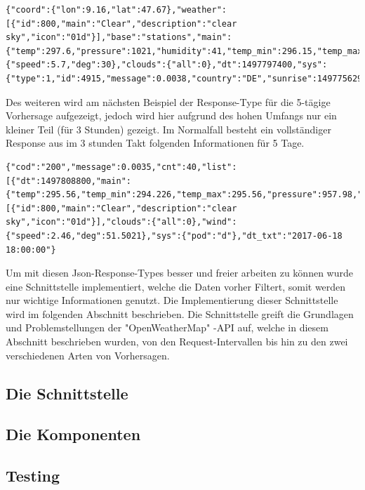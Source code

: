   \begin{lstlisting}
{"coord":{"lon":9.16,"lat":47.67},"weather":[{"id":800,"main":"Clear","description":"clear sky","icon":"01d"}],"base":"stations","main":{"temp":297.6,"pressure":1021,"humidity":41,"temp_min":296.15,"temp_max":298.15},"visibility":10000,"wind":{"speed":5.7,"deg":30},"clouds":{"all":0},"dt":1497797400,"sys":{"type":1,"id":4915,"message":0.0038,"country":"DE","sunrise":1497756293,"sunset":1497813872},"id":0,"name":"Konstanz","cod":200}
\end{lstlisting}

Des weiteren wird am nächsten Beispiel der Response-Type für die 5-tägige Vorhersage aufgezeigt, jedoch wird hier aufgrund des hohen Umfangs nur ein kleiner Teil (für 3 Stunden) gezeigt. Im Normalfall besteht ein vollständiger Response aus im 3 stunden Takt 
folgenden Informationen für 5 Tage.
 
  \begin{lstlisting}
{"cod":"200","message":0.0035,"cnt":40,"list":[{"dt":1497808800,"main":{"temp":295.56,"temp_min":294.226,"temp_max":295.56,"pressure":957.98,"sea_level":1034.02,"grnd_level":957.98,"humidity":53,"temp_kf":1.34},"weather":[{"id":800,"main":"Clear","description":"clear sky","icon":"01d"}],"clouds":{"all":0},"wind":{"speed":2.46,"deg":51.5021},"sys":{"pod":"d"},"dt_txt":"2017-06-18 18:00:00"}
\end{lstlisting}
\clearpage
Um mit diesen Json-Response-Types besser und freier arbeiten zu können wurde eine Schnittstelle implementiert, welche die Daten vorher Filtert, somit werden nur wichtige Informationen genutzt. Die Implementierung dieser Schnittstelle wird im folgenden Abschnitt beschrieben. Die Schnittstelle greift die Grundlagen und Problemstellungen der "OpenWeatherMap" -API auf, welche in diesem Abschnitt beschrieben wurden, von den Request-Intervallen bis hin zu den zwei verschiedenen Arten von Vorhersagen.

\subsection{Die Schnittstelle}
\subsection{Die Komponenten}
\subsection{Testing}
